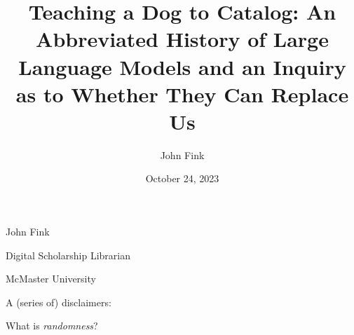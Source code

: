 \documentclass{beamer}
\title{Teaching a Dog to Catalog: An Abbreviated History of Large Language Models and an Inquiry as to Whether They Can Replace Us}
\author{John Fink}
\institute{McMaster University}
\date{October 24, 2023}
\begin{document}
\begin{frame}
    \maketitle
\end{frame}

\begin{frame}
	John Fink
	
	Digital Scholarship Librarian
	
	McMaster University
\end{frame}

% 




\begin{frame}
	A (series of) disclaimers:
\end{frame}
 

 \begin{frame}[plain]
 \end{frame}

 \begin{frame}
 	What is \textit{randomness}?
 \end{frame}
\end{document}
